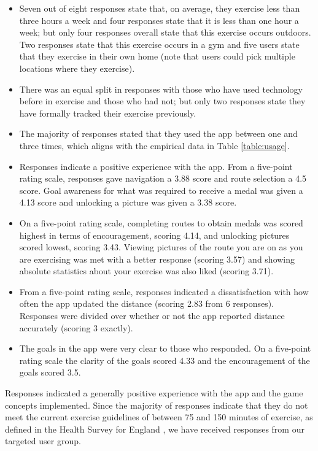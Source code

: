\begin{itemize}
  \item Seven out of eight responses state that, on average, they
    exercise less than three hours a week and four responses state
    that it is less than one hour a week; but only four responses overall
    state that this exercise occurs outdoors. Two responses state that
    this exercise occurs in a gym and five users state that they
    exercise in their own home (note that users could pick multiple
    locations where they exercise). 
  \item There was an equal split in responses with those who have used
    technology before in exercise and those who had not; but only two
    responses state they have formally tracked their exercise
    previously. 
  \item The majority of responses stated that they used the app
    between one and three times, which aligns with the empirical data
    in Table \ref{table:usage}.
  \item Responses indicate a positive experience with the app. From a
    five-point rating scale, responses gave navigation a 3.88 score and
    route selection a 4.5 score. Goal awareness for what was required
    to receive a medal was given a 4.13 score and unlocking a picture
    was given a 3.38 score.
  \item On a five-point rating scale, completing routes to obtain
    medals was scored highest in terms of encouragement, scoring 4.14,
    and unlocking pictures scored lowest, scoring 3.43. Viewing
    pictures of the route you are on as you are exercising was met
    with a better response (scoring 3.57) and showing absolute statistics
    about your exercise was also liked (scoring 3.71).
  \item From a five-point rating scale, responses indicated a
    dissatisfaction with how often the app updated the distance
    (scoring 2.83 from 6 responses). Responses were divided over
    whether or not the app reported distance accurately (scoring 3
    exactly). 
  \item The goals in the app were very clear to those who
    responded. On a five-point rating scale the clarity of the goals
    scored 4.33 and the encouragement of the goals scored 3.5.
\end{itemize}

Responses indicated a generally positive experience with the app and
the game concepts implemented. Since the majority of responses
indicate that they do not meet the current exercise guidelines of
between 75 and 150 minutes of exercise, as defined in the Health Survey
for England \cite{exercise_2012}, we have received responses from our
targeted user group. 

